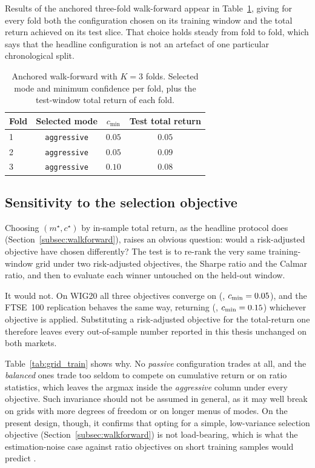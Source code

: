 Results of the anchored three-fold walk-forward appear in Table~\ref{tab:kfold}, giving for every fold both the configuration chosen on its training window and the total return achieved on its test slice. That choice holds steady from fold to fold, which says that the headline configuration is not an artefact of one particular chronological split.

\begin{table}[!htbp]
\centering
\caption{Anchored walk-forward with $K = 3$ folds. Selected mode and minimum confidence per fold, plus the test-window total return of each fold.}
\label{tab:kfold}
\begin{tabular}{lccc}
\toprule
\textbf{Fold} & \textbf{Selected mode} & \textbf{$c_{\min}$} & \textbf{Test total return} \\
\midrule
1 & \texttt{aggressive} & $0.05$ & $0.05$ \\
2 & \texttt{aggressive} & $0.05$ & $0.09$ \\
3 & \texttt{aggressive} & $0.10$ & $0.08$ \\
\bottomrule
\end{tabular}
\end{table}

\subsection{Sensitivity to the selection objective}\label{subsec:objective}

Choosing $(m^\star, c^\star)$ by in-sample total return, as the headline protocol does (Section~\ref{subsec:walkforward}), raises an obvious question: would a risk-adjusted objective have chosen differently? The test is to re-rank the very same training-window grid under two risk-adjusted objectives, the Sharpe ratio and the Calmar ratio, and then to evaluate each winner untouched on the held-out window.

It would not. On WIG20 all three objectives converge on (\ObjSharpeMode{}, $c_{\min} = 0.05{}$), and the FTSE~100 replication behaves the same way, returning (\FtseObjSharpeMode{}, $c_{\min} = 0.15{}$) whichever objective is applied. Substituting a risk-adjusted objective for the total-return one therefore leaves every out-of-sample number reported in this thesis unchanged on both markets.

Table~\ref{tab:grid_train} shows why. No \emph{passive} configuration trades at all, and the \emph{balanced} ones trade too seldom to compete on cumulative return or on ratio statistics, which leaves the argmax inside the \emph{aggressive} column under every objective. Such invariance should not be assumed in general, as it may well break on grids with more degrees of freedom or on longer menus of modes. On the present design, though, it confirms that opting for a simple, low-variance selection objective (Section~\ref{subsec:walkforward}) is not load-bearing, which is what the estimation-noise case against ratio objectives on short training samples would predict \cite{lo2002}.

